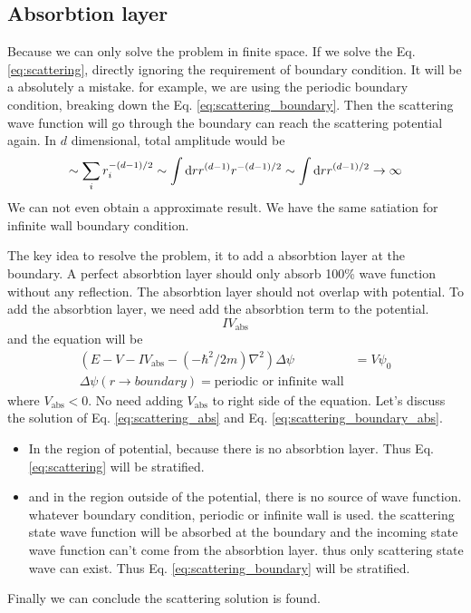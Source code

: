 \documentclass[12pt,twoside]{article}
\def\df{{\rm d}}
\begin{document}
\subsection{Absorbtion layer}
Because we can only solve the problem in finite space. If we solve the Eq. \ref{eq:scattering}, directly ignoring the requirement of boundary condition. It will be a absolutely a mistake. for example, we are using the periodic boundary condition, breaking down the Eq. \ref{eq:scattering_boundary}. Then the scattering wave function will go through the boundary can reach the scattering potential again. In $d$ dimensional, total amplitude would be
$$
\sim\sum_i r_i^{-(d-1)/2} \sim \int \df r r^{(d-1)} r^{-(d-1)/2} \sim \int \df r r^{(d-1)/2} \rightarrow \infty
$$
We can not even obtain a approximate result. We have the same satiation for infinite wall boundary condition.

The key idea to resolve the problem, it to add a absorbtion layer at the boundary. A perfect absorbtion layer should only absorb 100\% wave function without any reflection.
The absorbtion layer should not overlap with potential. To add the absorbtion layer, we need add the absorbtion term to the potential.
$$
IV_\text{abs}
$$
and the equation will be
\begin{align}\label{eq:scattering_abs}
(E - V - IV_\text{abs} -(-\hbar^2/2m)\nabla^2)\Delta\psi &= V\psi_0\\ \label{eq:scattering_boundary_abs}
\Delta\psi(r\rightarrow boundary) = \text{periodic or infinite wall}
\end{align}
where $V_\text{abs} < 0$. No need adding $V_\text{abs}$ to right side of the equation.
Let's discuss the solution of Eq. \ref{eq:scattering_abs} and Eq. \ref{eq:scattering_boundary_abs}.
\begin{itemize}
  \item In the region of potential, because there is no absorbtion layer. Thus Eq. \ref{eq:scattering} will be stratified.
  \item and in the region outside of the potential, there is no source of wave function. whatever boundary condition, periodic or infinite wall is used. the scattering state wave function will be absorbed at the boundary and the incoming state wave function can't come from the absorbtion layer. thus only scattering state wave can exist. Thus Eq. \ref{eq:scattering_boundary} will be stratified.
\end{itemize}
Finally we can conclude the scattering solution is found.
\end{document}

